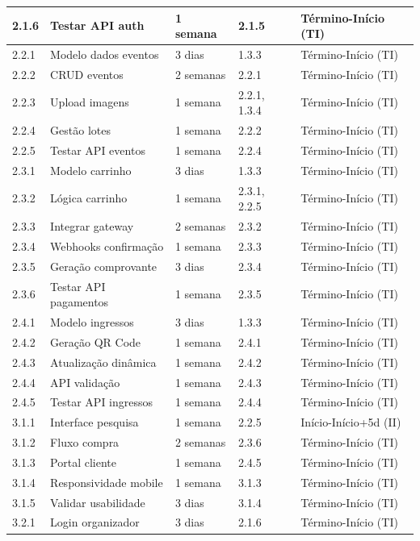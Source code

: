 \begin{table}[H]
\begin{tabular}{|p{1cm}|p{5cm}|p{2cm}|p{1.5cm}|p{3cm}|}
2.1.6 & Testar API auth & 1 semana & 2.1.5 & Término-Início (TI) \\ \hline
2.2.1 & Modelo dados eventos & 3 dias & 1.3.3 & Término-Início (TI) \\ \hline
2.2.2 & CRUD eventos & 2 semanas & 2.2.1 & Término-Início (TI) \\ \hline
2.2.3 & Upload imagens & 1 semana & 2.2.1, 1.3.4 & Término-Início (TI) \\ \hline
2.2.4 & Gestão lotes & 1 semana & 2.2.2 & Término-Início (TI) \\ \hline
2.2.5 & Testar API eventos & 1 semana & 2.2.4 & Término-Início (TI) \\ \hline
2.3.1 & Modelo carrinho & 3 dias & 1.3.3 & Término-Início (TI) \\ \hline
2.3.2 & Lógica carrinho & 1 semana & 2.3.1, 2.2.5 & Término-Início (TI) \\ \hline
2.3.3 & Integrar gateway & 2 semanas & 2.3.2 & Término-Início (TI) \\ \hline
2.3.4 & Webhooks confirmação & 1 semana & 2.3.3 & Término-Início (TI) \\ \hline
2.3.5 & Geração comprovante & 3 dias & 2.3.4 & Término-Início (TI) \\ \hline
2.3.6 & Testar API pagamentos & 1 semana & 2.3.5 & Término-Início (TI) \\ \hline
2.4.1 & Modelo ingressos & 3 dias & 1.3.3 & Término-Início (TI) \\ \hline
2.4.2 & Geração QR Code & 1 semana & 2.4.1 & Término-Início (TI) \\ \hline
2.4.3 & Atualização dinâmica & 1 semana & 2.4.2 & Término-Início (TI) \\ \hline
2.4.4 & API validação & 1 semana & 2.4.3 & Término-Início (TI) \\ \hline
2.4.5 & Testar API ingressos & 1 semana & 2.4.4 & Término-Início (TI) \\ \hline
3.1.1 & Interface pesquisa & 1 semana & 2.2.5 & Início-Início+5d (II) \\ \hline
3.1.2 & Fluxo compra & 2 semanas & 2.3.6 & Término-Início (TI) \\ \hline
3.1.3 & Portal cliente & 1 semana & 2.4.5 & Término-Início (TI) \\ \hline
3.1.4 & Responsividade mobile & 1 semana & 3.1.3 & Término-Início (TI) \\ \hline
3.1.5 & Validar usabilidade & 3 dias & 3.1.4 & Término-Início (TI) \\ \hline
3.2.1 & Login organizador & 3 dias & 2.1.6 & Término-Início (TI) \\ \hline

\end{tabular}
\end{table}
